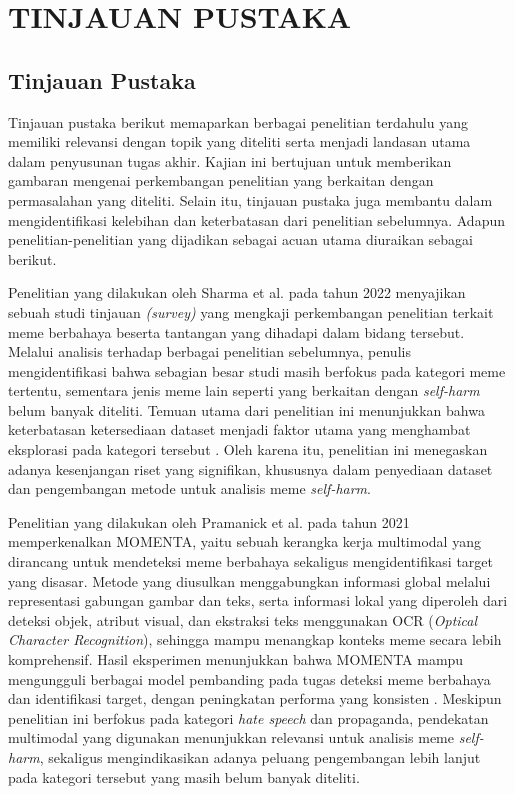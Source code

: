 \newpage
\chapter{TINJAUAN PUSTAKA} \label{Bab II}

\section{Tinjauan Pustaka} \label{II.Tinjauan}
Tinjauan pustaka berikut memaparkan berbagai penelitian terdahulu yang memiliki relevansi dengan topik yang diteliti serta menjadi landasan utama dalam penyusunan tugas akhir. Kajian ini bertujuan untuk memberikan gambaran mengenai perkembangan penelitian yang berkaitan dengan permasalahan yang diteliti. Selain itu, tinjauan pustaka juga membantu dalam mengidentifikasi kelebihan dan keterbatasan dari penelitian sebelumnya. Adapun penelitian-penelitian yang dijadikan sebagai acuan utama diuraikan sebagai berikut.

Penelitian yang dilakukan oleh Sharma et al. pada tahun 2022 menyajikan sebuah studi tinjauan \textit{(survey)} yang mengkaji perkembangan penelitian terkait meme berbahaya beserta tantangan yang dihadapi dalam bidang tersebut. Melalui analisis terhadap berbagai penelitian sebelumnya, penulis mengidentifikasi bahwa sebagian besar studi masih berfokus pada kategori meme tertentu, sementara jenis meme lain seperti yang berkaitan dengan \textit{self-harm} belum banyak diteliti. Temuan utama dari penelitian ini menunjukkan bahwa keterbatasan ketersediaan dataset menjadi faktor utama yang menghambat eksplorasi pada kategori tersebut \cite{Sharma2022HarmfulMemes}. Oleh karena itu, penelitian ini menegaskan adanya kesenjangan riset yang signifikan, khususnya dalam penyediaan dataset dan pengembangan metode untuk analisis meme \textit{self-harm}.

Penelitian yang dilakukan oleh Pramanick et al. pada tahun 2021 memperkenalkan MOMENTA, yaitu sebuah kerangka kerja multimodal yang dirancang untuk mendeteksi meme berbahaya sekaligus mengidentifikasi target yang disasar. Metode yang diusulkan menggabungkan informasi global melalui representasi gabungan gambar dan teks, serta informasi lokal yang diperoleh dari deteksi objek, atribut visual, dan ekstraksi teks menggunakan OCR (\textit{Optical Character Recognition}), sehingga mampu menangkap konteks meme secara lebih komprehensif. Hasil eksperimen menunjukkan bahwa MOMENTA mampu mengungguli berbagai model pembanding pada tugas deteksi meme berbahaya dan identifikasi target, dengan peningkatan performa yang konsisten \cite{pramanick2021momenta}. Meskipun penelitian ini berfokus pada kategori \textit{hate speech} dan propaganda, pendekatan multimodal yang digunakan menunjukkan relevansi untuk analisis meme \textit{self-harm}, sekaligus mengindikasikan adanya peluang pengembangan lebih lanjut pada kategori tersebut yang masih belum banyak diteliti.

